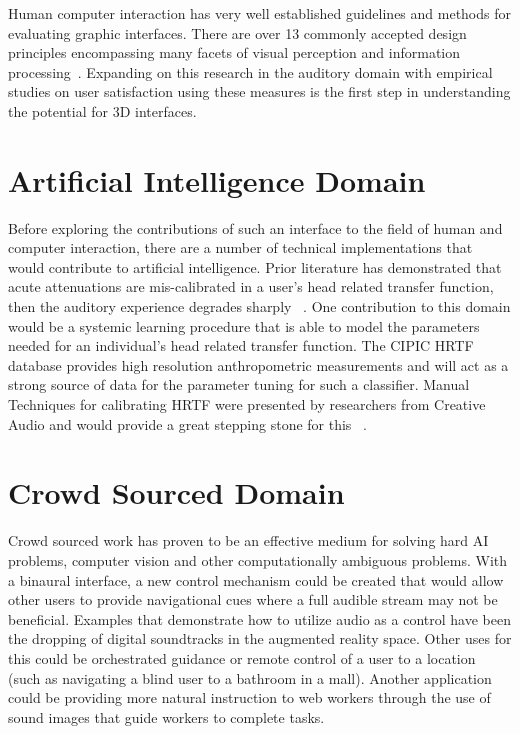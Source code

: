Human computer interaction has very well established guidelines and methods for
evaluating graphic interfaces. There are over 13 commonly accepted design
principles encompassing many facets of visual perception and information
processing~\cite{wickens2004intro}. Expanding on this research in
the auditory domain with empirical studies on user satisfaction using these
measures is the first step in understanding the potential for 3D interfaces.


\section{                  Artificial Intelligence Domain                     }

Before exploring the contributions of such an interface to the field of human
and computer interaction, there are a number of technical implementations that
would contribute to artificial intelligence.  Prior literature has
demonstrated that acute attenuations are mis-calibrated in a user's head
related transfer function, then the auditory experience degrades sharply
~\cite{algazi2001cipic}.  One contribution to this domain would be a systemic
learning procedure that is able to model the parameters needed for an
individual's head related transfer function.  The CIPIC HRTF database provides
high resolution anthropometric measurements and will act as a strong source of
data for the parameter tuning for such a classifier.  Manual Techniques for
calibrating HRTF were presented by researchers from Creative Audio and would
provide a great stepping stone for this ~\cite{jost2000transaural}.


\section{                  Crowd Sourced Domain                               }

Crowd sourced work has proven to be an effective medium for solving hard AI
problems, computer vision and other computationally ambiguous problems.  With a
binaural interface, a new control mechanism could be created that would allow
other users to provide navigational cues where a full audible stream may not
be beneficial.  Examples that demonstrate how to utilize audio as a control have
been the dropping of digital soundtracks in the augmented reality space.  Other
uses for this could be orchestrated guidance or remote control of a user to a
location (such as navigating a blind user to a bathroom in a mall).  Another
application could be providing more natural instruction to web workers through
the use of sound images that guide workers to complete tasks.



